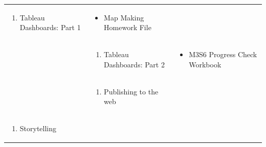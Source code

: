 \documentclass[
]{book}
\providecommand{\tightlist}{%
  \setlength{\itemsep}{0pt}\setlength{\parskip}{0pt}}
\begin{document}
\begin{longtable}[]{@{}lll@{}}
\begin{minipage}[t]{0.34\columnwidth}
\begin{enumerate}
\def\labelenumi{\arabic{enumi}.}
\setcounter{enumi}{4}
\tightlist
\item
  Tableau Dashboards: Part 1
\end{enumerate}\strut
\end{minipage} & \begin{minipage}[t]{0.42\columnwidth}\raggedright
\begin{itemize}
\tightlist
\item
  Map Making Homework File
\end{itemize}\strut
\end{minipage}\tabularnewline
\begin{minipage}[t]{0.15\columnwidth}\raggedright
\strut
\end{minipage} & \begin{minipage}[t]{0.34\columnwidth}\raggedright
\begin{enumerate}
\def\labelenumi{\arabic{enumi}.}
\setcounter{enumi}{5}
\tightlist
\item
  Tableau Dashboards: Part 2
\end{enumerate}\strut
\end{minipage} & \begin{minipage}[t]{0.42\columnwidth}\raggedright
\begin{itemize}
\tightlist
\item
  M3S6 Progress Check Workbook
\end{itemize}\strut
\end{minipage}\tabularnewline
\begin{minipage}[t]{0.15\columnwidth}\raggedright
\strut
\end{minipage} & \begin{minipage}[t]{0.34\columnwidth}\raggedright
\begin{enumerate}
\def\labelenumi{\arabic{enumi}.}
\setcounter{enumi}{6}
\tightlist
\item
  Publishing to the web
\end{enumerate}\strut
\end{minipage} & \begin{minipage}[t]{0.42\columnwidth}\raggedright
\strut
\end{minipage}\tabularnewline
\begin{minipage}[t]{0.15\columnwidth}\raggedright
\begin{enumerate}
\def\labelenumi{\arabic{enumi}.}
\setcounter{enumi}{3}
\tightlist
\item
  Storytelling
\end{enumerate}\strut

\end{minipage}
\end{longtable}
\end{document}
